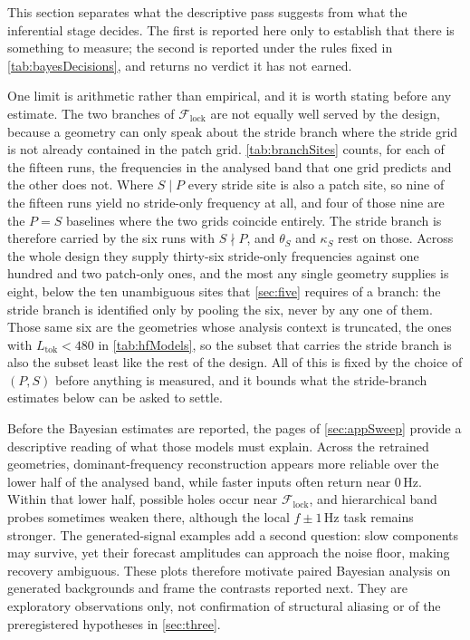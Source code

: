 This section separates what the descriptive pass suggests from what the inferential stage decides. The first is reported here only to establish that there is something to measure; the second is reported under the rules fixed in \autoref{tab:bayesDecisions}, and returns no verdict it has not earned.



One limit is arithmetic rather than empirical, and it is worth stating before any estimate. The two branches of $\mathcal F_{\mathrm{lock}}$ are not equally well served by the design, because a geometry can only speak about the stride branch where the stride grid is not already contained in the patch grid. \autoref{tab:branchSites} counts, for each of the fifteen runs, the frequencies in the analysed band that one grid predicts and the other does not. Where $S \mid P$ every stride site is also a patch site, so nine of the fifteen runs yield no stride-only frequency at all, and four of those nine are the $P=S$ baselines where the two grids coincide entirely. The stride branch is therefore carried by the six runs with $S \nmid P$, and $\theta_S$ and $\kappa_S$ rest on those. Across the whole design they supply thirty-six stride-only frequencies against one hundred and two patch-only ones, and the most any single geometry supplies is eight, below the ten unambiguous sites that \autoref{sec:five} requires of a branch: the stride branch is identified only by pooling the six, never by any one of them. Those same six are the geometries whose analysis context is truncated, the ones with $L_{\mathrm{tok}}<480$ in \autoref{tab:hfModels}, so the subset that carries the stride branch is also the subset least like the rest of the design. All of this is fixed by the choice of $(P,S)$ before anything is measured, and it bounds what the stride-branch estimates below can be asked to settle.

Before the Bayesian estimates are reported, the pages of \autoref{sec:appSweep} provide a descriptive reading of what those models must explain. Across the retrained geometries, dominant-frequency reconstruction appears more reliable over the lower half of the analysed band, while faster inputs often return near $0$\,Hz. Within that lower half, possible holes occur near $\mathcal F_{\mathrm{lock}}$, and hierarchical band probes sometimes weaken there, although the local $f\pm1$\,Hz task remains stronger. The generated-signal examples add a second question: slow components may survive, yet their forecast amplitudes can approach the noise floor, making recovery ambiguous. These plots therefore motivate paired Bayesian analysis on generated backgrounds and frame the contrasts reported next. They are exploratory observations only, not confirmation of structural aliasing or of the preregistered hypotheses in \autoref{sec:three}.

